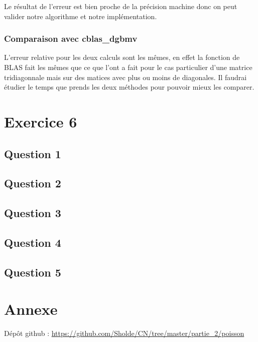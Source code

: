 \documentclass[11pt]{article}
\begin{document}
Le résultat de l'erreur est bien proche de la précision machine donc
on peut valider notre algorithme et notre implémentation.

\subsubsection{Comparaison avec cblas\_dgbmv}

L'erreur relative pour les deux calculs sont les mêmes, en effet la
fonction de BLAS fait les mêmes que ce que l'ont a fait pour le
cas particulier d'une matrice tridiagonnale mais sur des matices avec
plus ou moins de diagonales. Il faudrai étudier le temps que prends les
deux méthodes pour pouvoir mieux les comparer.

\section{Exercice 6}

\subsection{Question 1}

\subsection{Question 2}

\subsection{Question 3}

\subsection{Question 4}

\subsection{Question 5}

\section{Annexe}

Dépôt github : \url{https://github.com/Sholde/CN/tree/master/partie_2/poisson}
\end{document}
